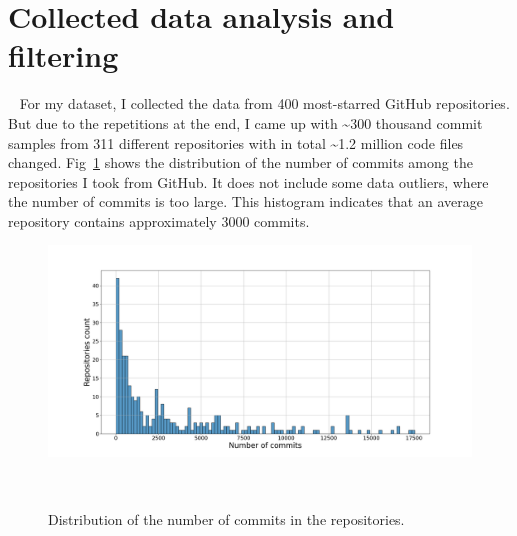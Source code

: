 \section{Collected data analysis and filtering}~\label{sec:data_analysis}
For my dataset, I collected the data from 400 most-starred GitHub repositories. But due to the repetitions at the end, I came up with \textasciitilde{}300 thousand commit samples from 311 different repositories with in total \textasciitilde{}1.2 million code files changed. Fig~\ref{fig:commits_distribution} shows the distribution of the number of commits among the repositories I took from GitHub. It does not include some data outliers, where the number of commits is too large. This histogram indicates that an average repository contains approximately 3000 commits. 
\begin{figure}[H]
    \includegraphics[scale=0.30]{figs/Commits distribution.png}
    \caption{Distribution of the number of commits in the repositories.}~\label{fig:commits_distribution}
\end{figure}

